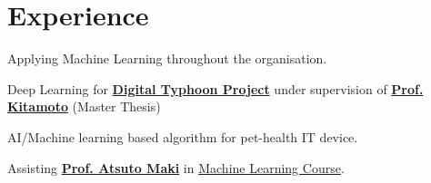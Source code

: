 \documentclass[]{deedy-resume}
\begin{document}
%
%
\lastupdated

%
%
%
%

\begin{minipage}[t]{0.54\textwidth}

\section{Experience}

Applying Machine Learning throughout the organisation.
\sectionsep

Deep Learning for \textbf{\href{http://agora.ex.nii.ac.jp/~kitamoto/research/typhoon/}{Digital Typhoon Project}} under supervision of  \href{http://www.nii.ac.jp/en/faculty/digital_content/kitamoto_asanobu/}{\textbf{Prof. Kitamoto}} (Master Thesis)
\sectionsep

AI/Machine learning based algorithm for pet-health IT device.
\sectionsep

Assisting \href{http://www.csc.kth.se/~atsuto/}{\textbf{Prof. Atsuto Maki}} in \href{https://www.kth.se/social/course/DD2431/}{Machine Learning Course}.
\sectionsep




\end{minipage}
\end{document}
